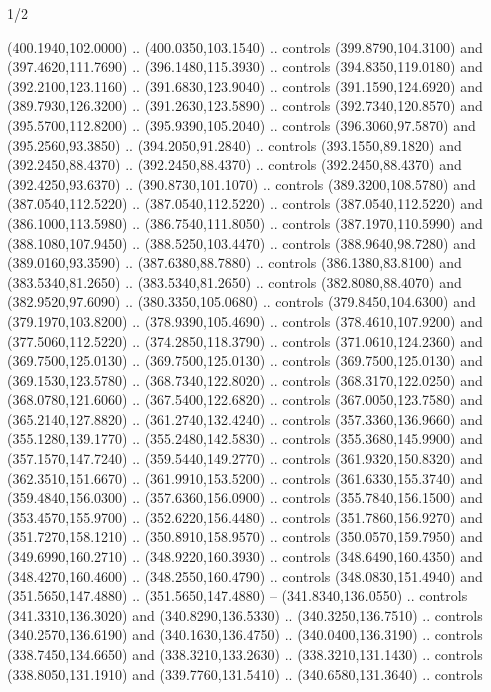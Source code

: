 \begin{flagdescription}{1/2}
\begin{scope}[xshift=0.5\flaglength]
\begin{scope}[scale=0.004\flagwidth,xshift=-90mm,yshift=89mm]
\begin{scope}[y=0.80pt, x=0.80pt, yscale=-1, xscale=1, inner sep=0pt, outer sep=0pt]
  (400.1940,102.0000) .. (400.0350,103.1540) .. controls (399.8790,104.3100) and
  (397.4620,111.7690) .. (396.1480,115.3930) .. controls (394.8350,119.0180) and
  (392.2100,123.1160) .. (391.6830,123.9040) .. controls (391.1590,124.6920) and
  (389.7930,126.3200) .. (391.2630,123.5890) .. controls (392.7340,120.8570) and
  (395.5700,112.8200) .. (395.9390,105.2040) .. controls (396.3060,97.5870) and
  (395.2560,93.3850) .. (394.2050,91.2840) .. controls (393.1550,89.1820) and
  (392.2450,88.4370) .. (392.2450,88.4370) .. controls (392.2450,88.4370) and
  (392.4250,93.6370) .. (390.8730,101.1070) .. controls (389.3200,108.5780) and
  (387.0540,112.5220) .. (387.0540,112.5220) .. controls (387.0540,112.5220) and
  (386.1000,113.5980) .. (386.7540,111.8050) .. controls (387.1970,110.5990) and
  (388.1080,107.9450) .. (388.5250,103.4470) .. controls (388.9640,98.7280) and
  (389.0160,93.3590) .. (387.6380,88.7880) .. controls (386.1380,83.8100) and
  (383.5340,81.2650) .. (383.5340,81.2650) .. controls (382.8080,88.4070) and
  (382.9520,97.6090) .. (380.3350,105.0680) .. controls (379.8450,104.6300) and
  (379.1970,103.8200) .. (378.9390,105.4690) .. controls (378.4610,107.9200) and
  (377.5060,112.5220) .. (374.2850,118.3790) .. controls (371.0610,124.2360) and
  (369.7500,125.0130) .. (369.7500,125.0130) .. controls (369.7500,125.0130) and
  (369.1530,123.5780) .. (368.7340,122.8020) .. controls (368.3170,122.0250) and
  (368.0780,121.6060) .. (367.5400,122.6820) .. controls (367.0050,123.7580) and
  (365.2140,127.8820) .. (361.2740,132.4240) .. controls (357.3360,136.9660) and
  (355.1280,139.1770) .. (355.2480,142.5830) .. controls (355.3680,145.9900) and
  (357.1570,147.7240) .. (359.5440,149.2770) .. controls (361.9320,150.8320) and
  (362.3510,151.6670) .. (361.9910,153.5200) .. controls (361.6330,155.3740) and
  (359.4840,156.0300) .. (357.6360,156.0900) .. controls (355.7840,156.1500) and
  (353.4570,155.9700) .. (352.6220,156.4480) .. controls (351.7860,156.9270) and
  (351.7270,158.1210) .. (350.8910,158.9570) .. controls (350.0570,159.7950) and
  (349.6990,160.2710) .. (348.9220,160.3930) .. controls (348.6490,160.4350) and
  (348.4270,160.4600) .. (348.2550,160.4790) .. controls (348.0830,151.4940) and
  (351.5650,147.4880) .. (351.5650,147.4880) -- (341.8340,136.0550) .. controls
  (341.3310,136.3020) and (340.8290,136.5330) .. (340.3250,136.7510) .. controls
  (340.2570,136.6190) and (340.1630,136.4750) .. (340.0400,136.3190) .. controls
  (338.7450,134.6650) and (338.3210,133.2630) .. (338.3210,131.1430) .. controls
  (338.8050,131.1910) and (339.7760,131.5410) .. (340.6580,131.3640) .. controls

\end{scope}
\end{scope}
\end{scope}
\end{flagdescription}
